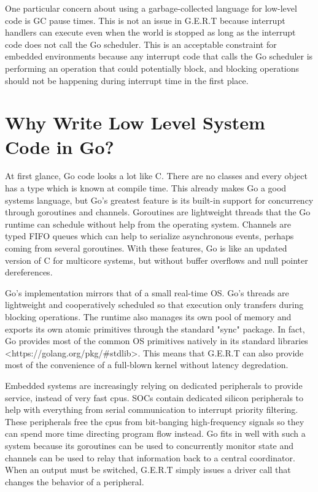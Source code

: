 One particular concern about using a garbage-collected language
for low-level code is GC pause times. This is not an issue in G.E.R.T because interrupt
handlers can execute even when the world is stopped as long as the interrupt code
does not call the Go scheduler. This is an acceptable constraint for embedded
environments because any interrupt code that calls the Go scheduler is performing
an operation that could potentially block, and blocking operations should not
be happening during interrupt time in the first place.


\section{Why Write Low Level System Code in Go?}

At first glance, Go code looks a lot like C. There are no
classes and every object has a type which is known at compile time.
This already makes Go a good systems language, but Go's
greatest feature is its built-in support for concurrency through
goroutines and channels. Goroutines are lightweight threads that
the Go runtime can schedule without help from the operating system.
Channels are typed FIFO queues which can help to serialize
asynchronous events, perhaps coming from several goroutines.
With these features, Go is like an updated version
of C for multicore systems, but without buffer overflows and
null pointer dereferences.

Go's implementation mirrors that of a small
real-time OS. Go's threads are lightweight and
cooperatively scheduled so that execution only transfers during
blocking operations. The runtime also manages its own pool of memory
and exports its own atomic primitives through the standard "sync"
package. In fact, Go provides most of the common OS primitives natively
in its standard libraries <https://golang.org/pkg/\#stdlib>. This means
that G.E.R.T can also provide most of the convenience of a full-blown kernel
without latency degredation.

Embedded systems are increasingly relying on dedicated peripherals to
provide service, instead of very fast cpus. SOCs contain dedicated
silicon peripherals to help with everything from serial communication to
interrupt priority filtering. These peripherals free the cpus from bit-banging
high-frequency signals so they can spend more time directing program
flow instead. Go fits in well with such a system because its goroutines can be
used to concurrently monitor state and channels can be used to relay that information
back to a central coordinator. When an output must be switched, G.E.R.T simply
issues a driver call that changes the behavior of a peripheral.

